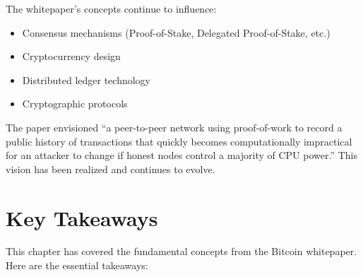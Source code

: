 The whitepaper's concepts continue to influence:

\begin{itemize}
  \item Consensus mechanisms (Proof-of-Stake, Delegated Proof-of-Stake, etc.)
  \item Cryptocurrency design
  \item Distributed ledger technology
  \item Cryptographic protocols
\end{itemize}

The paper envisioned ``a peer-to-peer network using proof-of-work to record a public history of transactions that quickly becomes computationally impractical for an attacker to change if honest nodes control a majority of CPU power.'' This vision has been realized and continues to evolve.


\section{Key Takeaways}
\label{sec:takeaways}

This chapter has covered the fundamental concepts from the Bitcoin whitepaper. Here are the essential takeaways:

